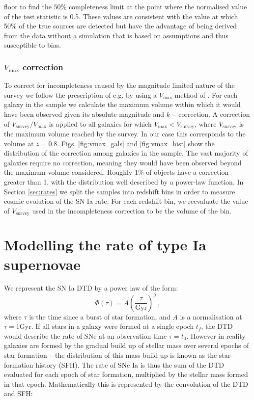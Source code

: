 \documentclass[fleqn,usenatbib]{mnras}
\begin{document}
floor to find the 50\% completeness limit at the point where the normalised value of the test statistic is 0.5. These values are consistent with the value at which 50\% of the true sources are detected but have the advantage of being derived from the data without a simulation that is based on assumptions and thus susceptible to bias.

\subsubsection{$V_{\mathrm{max}}$ correction \label{subsubsec:vmax_corr}}

To correct for incompleteness caused by the magnitude limited nature of the survey we follow the prescription of e.g. \citet{Sullivan2006, Smith2012} by using a $V_{\mathrm{max}}$ method of \citet{Schmid1968}. For each galaxy in the sample we calculate the maximum volume within which it would have been observed given its absolute magnitude and $k-$correction. A correction of $V_{\mathrm{survey}}/V_{\mathrm{max}}$ is applied to all galaxies for which $V_{\mathrm{max}} < V_{\mathrm{survey}}$, where $V_{\mathrm{survey}}$ is the maximum volume reached by the survey. In our case this corresponds to the volume at $z=0.8$. Figs. \ref{fig:vmax_gals} and \ref{fig:vmax_hist} show the distribution of the correction among galaxies in the sample. The vast majority of galaxies require no correction, meaning they would have been observed beyond the maximum volume considered. Roughly 1\% of objects have a correction greater than 1, with the distribution well described by a power-law function. In Section \ref{sec:rates} we split the samples into redshift bins in order to measure cosmic evolution of the SN Ia rate. For each redshift bin, we reevaluate the value of $V_{\mathrm{survey}}$ used in the incompleteness correction to be the volume of the bin.


\section{Modelling the rate of type Ia supernovae}
 \label{sec:method}
We represent the SN Ia DTD by a power law of the form:
\begin{equation}
    \Phi(\tau) = A\left(\frac{\tau}{\mathrm{Gyr}}\right)^{\beta}\,,
\end{equation} 
where $\tau$ is the time since a burst of star formation, and $A$ is a normalisation at $\tau=1\mathrm{Gyr}$. If all stars in a galaxy were formed at a single epoch $t_f$, the DTD would describe the rate of SNe at an observation time $\tau = t_0$. However in reality galaxies are formed by the gradual build up of stellar mass over several epochs of star formation -- the distribution of this mass build up is known as the star-formation history (SFH). The rate of SNe Ia is thus the sum of the DTD evaluated for each epoch of star formation, multiplied by the stellar mass formed in that epoch. Mathematically this is represented by the convolution of the DTD and SFH:
 
\end{document}
